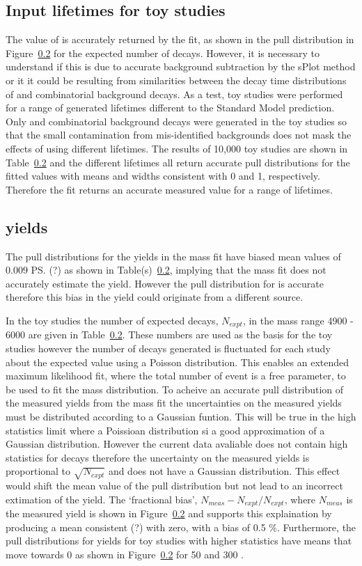 \subsection{Input lifetimes for toy studies}
The value of \Gmumu is accurately returned by the fit, as shown in the pull distribution in Figure~\ref{} for the expected number of decays. However, it is necessary to understand if this is due to accurate background subtraction by the sPlot method or it it could be resulting from similarities between the decay time distributions of \bsmumu and combinatorial background decays. As a test, toy studies were performed for a range of generated \bsmumu lifetimes different to the Standard Model prediction. Only \bsmumu and combinatorial background decays were generated in the toy studies so that the small contamination from mis-identified backgrounds does not mask the effects of using different lifetimes. The results of 10,000 toy studies are shown in Table~\ref{} and the different lifetimes all return accurate pull distributions for the fitted \Gmumu values with means and widths consistent with 0 and 1, respectively. Therefore the fit returns an accurate measured value for a range of \bsmumu lifetimes.

\subsection{\bsmumu yields}
The pull distributions for the \bsmumu yields in the mass fit have biased mean values of 0.009 \ps (?) as shown in Table(s)~\ref{}, implying that the mass fit does not accurately estimate the \bsmumu yield. However the pull distribution for \Gmumu is accurate therefore this bias in the \bsmumu yield could originate from a different source.

In the toy studies the number of expected decays, $N_{expt}$, in the mass range 4900 - 6000 \mevcc are given in Table~\ref{}. These numbers are used as the basis for the toy studies however the number of decays generated is fluctuated for each study about the expected value using a Poisson distribution. This enables an extended maximum likelihood fit, where the total number of event is a free parameter, to be used to fit the mass distribution. To acheive an accurate pull distribution of the measured \bsmumu yields from the mass fit the uncertainties on the measured yields must be distributed according to a Gaussian funtion. This will be true in the high statistics limit where a Poissioan distribution si a good approximation of a Gaussian distribution. However the current data avaliable does not contain high statistics for \bsmumu decays therefore the uncertainty on the measured yields is proportional to $\sqrt{N_{expt}}$ and does not have a Gaussian distribution. This effect would shift the mean value of the pull distribution but not lead to an incorrect extimation of the \bsmumu yield. The `fractional bias', $N_{meas} - N_{expt}/N_{expt}$, where $N_{meas}$ is the measured \bsmumu yield is shown in Figure~\ref{} and supports this explaination by producing a mean consistent (?) with zero, with a bias of 0.5 $\%$. Furthermore, the pull distributions for \bsmumu yields for toy studies with higher statistics have means that move towards 0 as shown in Figure~\ref{} for 50 and 300 \fb. 

